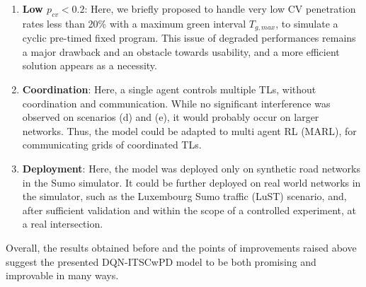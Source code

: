 \begin{enumerate}
  \item \textbf{Low $p_{cv} < 0.2$}: Here, we briefly proposed to handle very low CV penetration rates less than 20\% with a maximum green interval $T_{g,max}$, to simulate a cyclic pre-timed fixed program. This issue of degraded performances remains a major drawback and an obstacle towards usability, and a more efficient solution appears as a necessity.
  \item \textbf{Coordination}: Here, a single agent controls multiple TLs, without coordination and communication. While no significant interference was observed on scenarios (d) and (e), it would probably occur on larger networks. Thus, the model could be adapted to multi agent RL (MARL), for communicating grids of coordinated TLs.
  \item \textbf{Deployment}: Here, the model was deployed only on synthetic road networks in the Sumo simulator. It could be further deployed on real world networks in the simulator, such as the Luxembourg Sumo traffic (LuST) scenario, and, after sufficient validation and within the scope of a controlled experiment, at a real intersection.
\end{enumerate}

Overall, the results obtained before and the points of improvements raised above suggest the presented DQN-ITSCwPD model to be both promising and improvable in many ways. 

\pagebreak